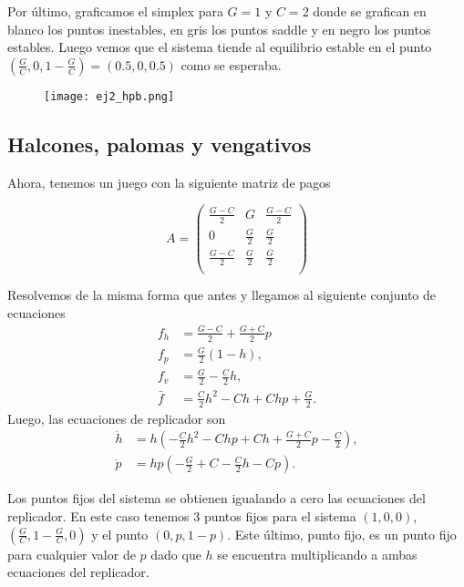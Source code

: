 \documentclass[letterpaper,12pt]{article}
\theoremstyle{plain}
\begin{document}
Por último, graficamos el simplex para $G = 1$ y $C = 2$ donde se grafican en blanco los puntos inestables, en gris los puntos saddle y en negro los puntos estables. Luego vemos que el sistema tiende al equilibrio estable en el punto $(\frac{G}{C},0,1-\frac{G}{C}) = (0.5,0,0.5)$ como se esperaba.

\begin{figure}[h]
    \centering
    \texttt{[image: ej2\_hpb.png]}
    \caption{} 
    \label{fig:ej2_hpb}
\end{figure}

\subsection{Halcones, palomas y vengativos}

Ahora, tenemos un juego con la siguiente matriz de pagos

\begin{equation*}
    A =
\begin{pmatrix}
\frac{G-C}{2} & G & \frac{G-C}{2} \\[6pt]
0 & \frac{G}{2} & \frac{G}{2} \\[6pt]
\frac{G-C}{2} & \frac{G}{2} & \frac{G}{2} \\
\end{pmatrix}
\end{equation*}

Resolvemos de la misma forma que antes y llegamos al siguiente conjunto de ecuaciones
\begin{align}
    f_h &= \frac{G-C}{2}+\frac{G+C}{2}p \\
    f_p &= \frac{G}{2}(1-h), \\
    f_v &= \frac{G}{2}-\frac{C}{2}h, \\
    \bar{f} &= \frac{C}{2}h^2-Ch+Chp+\frac{G}{2}.
\end{align}
Luego, las ecuaciones de replicador son  
\begin{align}
    \dot{h} &= h\left(-\frac{C}{2}h^2-Chp+Ch+\frac{G+C}{2}p-\frac{C}{2} \right), \\
    \dot{p} &= hp\left(-\frac{G}{2}+C-\frac{C}{2}h-Cp \right).
\end{align}

Los puntos fijos del sistema se obtienen igualando a cero las ecuaciones del replicador. En este caso tenemos 3 puntos fijos para el sistema $(1,0,0)$, $(\frac{G}{C},1 - \frac{G}{C},0)$ y el punto $(0,p,1-p)$. Este último, punto fijo, es un punto fijo para cualquier valor de $p$ dado que $h$ se encuentra multiplicando a ambas ecuaciones del replicador.
\end{document}
